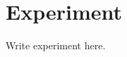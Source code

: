 \documentclass[a4paper,11pt,oneside,openany,fleqn]{jsbook}
\begin{document}
    \chapter{Experiment}
    Write experiment here.
\end{document}
